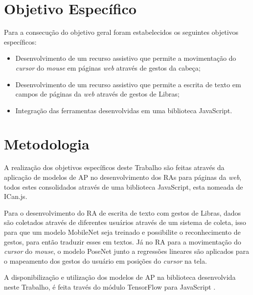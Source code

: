 \section{Objetivo Espec\'ifico}

\par Para a consecução do objetivo geral foram estabelecidos os seguintes objetivos específicos:

\begin{itemize}
    \item Desenvolvimento de um recurso assistivo que permite a movimentação do \textit{cursor} do \textit{mouse} em páginas \textit{web} através de gestos da cabeça;
    \item Desenvolvimento de um recurso assistivo que permite a escrita de texto em campos de páginas da \textit{web} através de gestos de Libras;
    \item Integração das ferramentas desenvolvidas em uma biblioteca JavaScript.
\end{itemize}

\section{Metodologia} %

\par A realização dos objetivos específicos deste Trabalho são feitas através da aplicação de modelos de AP no desenvolvimento dos RAs para páginas da \textit{web}, todos estes consolidados através de uma biblioteca JavaScript, esta nomeada de ICan.js.

\par Para o desenvolvimento do RA de escrita de texto com gestos de Libras, dados são coletados através de diferentes usuários através de um sistema de coleta, isso para que um modelo MobileNet \cite{howard2017mobilenets} seja treinado e possibilite o reconhecimento de gestos, para então traduzir esses em textos. Já no RA para a movimentação do \textit{cursor} do \textit{mouse}, o modelo PoseNet \cite{PoseNetMedium2019} junto a regressões lineares são aplicados para o mapeamento dos gestos do usuário em posições do \textit{cursor} na tela.

\par A disponibilização e utilização dos modelos de AP na biblioteca desenvolvida neste Trabalho, é feita través do módulo TensorFlow para JavaScript \cite{tensorflowjs2019}.


